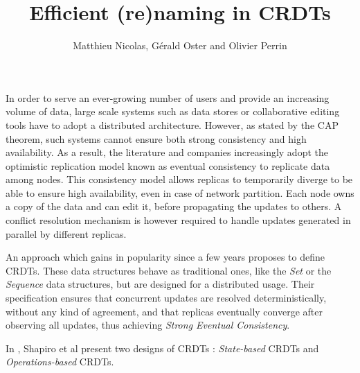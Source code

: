 \documentclass{article}
\title{Efficient (re)naming in \acp{CRDT}}
\author{Matthieu Nicolas, Gérald Oster and Olivier Perrin}
\begin{document}
\maketitle
\thispagestyle{empty}


In order to serve an ever-growing number of users and provide an increasing volume of data,
large scale systems such as data stores\cite{Antidote} or collaborative editing tools\cite{nicolas:hal-01655438} have to adopt a distributed architecture.
However, as stated by the CAP theorem\cite{BrewerPoDC2000}, such systems cannot ensure both strong consistency and high availability.
As a result, the literature and companies increasingly adopt the optimistic replication model known as eventual consistency to replicate data among nodes.
This consistency model allows replicas to temporarily diverge to be able to ensure high availability, even in case of network partition.
Each node owns a copy of the data and can edit it, before propagating the updates to others.
A conflict resolution mechanism is however required to handle updates generated in parallel by different replicas.


An approach which gains in popularity since a few years proposes to define \acfp{CRDT}\cite{shapiro:inria-00555588}.
These data structures behave as traditional ones, like the \emph{Set} or the \emph{Sequence} data structures, but are designed for a distributed usage.
Their specification ensures that concurrent updates are resolved deterministically, without any kind of agreement, and that replicas eventually converge after observing all updates,
thus achieving \emph{Strong Eventual Consistency}\cite{ShapiroSSS2011}.

In \cite{shapiro:inria-00555588}, Shapiro et al present two designs of \acp{CRDT} :
\emph{State-based} \acp{CRDT} and \emph{Operations-based} \acp{CRDT}.
\end{document}
